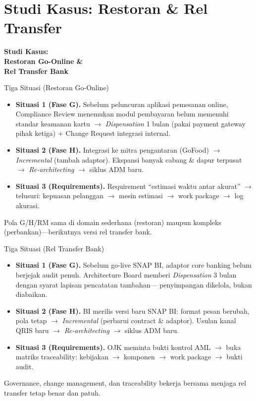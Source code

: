 \documentclass[aspectratio=169, table]{beamer}
\newcommand{\sectionframe}[1]{%
  \begin{frame}{\hfill}
    \centering
    \Huge{\textbf{#1}}
  \end{frame}
}
\newcommand{\takeaway}[1]{%
  \vspace{4pt}
  {\footnotesize #1}
}
\begin{document}
\section{Studi Kasus: Restoran \& Rel Transfer}
\sectionframe{Studi Kasus:\\ Restoran Go-Online \&\\ Rel Transfer Bank}

\begin{frame}{Tiga Situasi (Restoran Go-Online)}
  \vspace{4pt}
  \footnotesize
  \begin{itemize}\setlength{\itemsep}{4pt}
    \item \textbf{Situasi 1 (Fase G).} Sebelum peluncuran aplikasi pemesanan
          online, Compliance Review menemukan modul pembayaran belum memenuhi
          standar keamanan kartu $\rightarrow$ \emph{Dispensation} 1 bulan (pakai
          payment gateway pihak ketiga) + Change Request integrasi internal.
    \item \textbf{Situasi 2 (Fase H).} Integrasi ke mitra pengantaran (GoFood)
          $\rightarrow$ \emph{Incremental} (tambah adaptor). Ekspansi banyak cabang
          \& dapur terpusat $\rightarrow$ \emph{Re-architecting} $\rightarrow$
          siklus ADM baru.
    \item \textbf{Situasi 3 (Requirements).} Requirement ``estimasi waktu antar
          akurat'' $\rightarrow$ telusuri: kepuasan pelanggan $\rightarrow$ mesin
          estimasi $\rightarrow$ work package $\rightarrow$ log akurasi.
  \end{itemize}
  \takeaway{Pola G/H/RM sama di domain sederhana (restoran) maupun kompleks
  (perbankan)---berikutnya versi rel transfer bank.}
\end{frame}

\begin{frame}{Tiga Situasi (Rel Transfer Bank)}
  \vspace{4pt}
  \footnotesize
  \begin{itemize}\setlength{\itemsep}{4pt}
    \item \textbf{Situasi 1 (Fase G).} Sebelum go-live SNAP BI, adaptor core
          banking belum berjejak audit penuh. Architecture Board memberi
          \emph{Dispensation} 3 bulan dengan syarat lapisan pencatatan tambahan---
          penyimpangan dikelola, bukan diabaikan.
    \item \textbf{Situasi 2 (Fase H).} BI merilis versi baru SNAP BI: format pesan
          berubah, pola tetap $\rightarrow$ \emph{Incremental} (perbarui contract
          \& adaptor). Usulan kanal QRIS baru $\rightarrow$ \emph{Re-architecting}
          $\rightarrow$ siklus ADM baru.
    \item \textbf{Situasi 3 (Requirements).} OJK meminta bukti kontrol AML $\rightarrow$
          buka matriks traceability: kebijakan $\rightarrow$ komponen $\rightarrow$
          work package $\rightarrow$ bukti audit.
  \end{itemize}
  \takeaway{Governance, change management, dan traceability bekerja bersama menjaga
  rel transfer tetap benar dan patuh.}
\end{frame}
\end{document}
